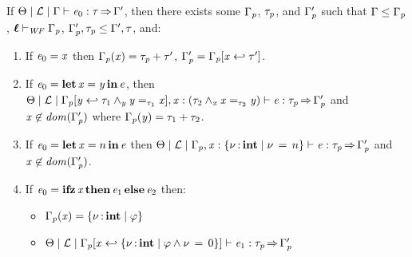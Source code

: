 \begin{lemma}[Inversion] %
  \label{lem:inversion}
  If 
  $ \Theta   \mid   \mathcal{L}   \mid   \Gamma   \vdash   \mathit{e_{{\mathrm{0}}}}  :  \tau   \operatorname{\Rightarrow}   \Gamma' $,
  then there exists some $\Gamma_{\mathit{p}}$, $\tau_{\mathit{p}}$, and $\Gamma'_{\mathit{p}}$
  such that $\Gamma  \leq  \Gamma_{\mathit{p}}$, $ \oldvec{\ell}   \vdash _{\wf}  \Gamma_{\ottmv{p}} $, $\Gamma'_{\mathit{p}}  ,  \tau_{\mathit{p}}  \leq  \Gamma'  ,  \tau$, and:
  \begin{enumerate}
  \item If $\mathit{e_{{\mathrm{0}}}}  =  \mathit{x}$ then $\Gamma_{\mathit{p}}  (  \mathit{x}  )  =  \tau_{\mathit{p}}  +  \tau'$,  $\Gamma'_{\mathit{p}}  =  \Gamma_{\mathit{p}}  [  \mathit{x}  \hookleftarrow  \tau'  ]$.
  \item If $\mathit{e_{{\mathrm{0}}}}  =   \operatorname{\mathbf{let}}  \mathit{x}  =  \mathit{y}  \operatorname{\mathbf{in}}  \mathit{e} $, then
    $ \Theta   \mid   \mathcal{L}   \mid   \Gamma_{\mathit{p}}  [  \mathit{y}  \hookleftarrow   \tau_{{\mathrm{1}}}  \wedge_{ \mathit{y} }   \mathit{y}  =_{ \tau_{{\mathrm{1}}} }  \mathit{x}    ]  ,  \mathit{x}  :  (   \tau_{{\mathrm{2}}}  \wedge_{ \mathit{x} }   \mathit{x}  =_{ \tau_{{\mathrm{2}}} }  \mathit{y}    )   \vdash   \mathit{e}  :  \tau_{\mathit{p}}   \operatorname{\Rightarrow}   \Gamma'_{\mathit{p}} $
    and $ \mathit{x}  \not\in   \mathit{dom}( \Gamma'_{\mathit{p}} )  $ where $\Gamma_{\mathit{p}}  (  \mathit{y}  )  =  \tau_{{\mathrm{1}}}  +  \tau_{{\mathrm{2}}}$.
  \item If $\mathit{e_{{\mathrm{0}}}}  =   \operatorname{\mathbf{let}}  \mathit{x}  =  n  \operatorname{\mathbf{in}}  \mathit{e} $ then $ \Theta   \mid   \mathcal{L}   \mid   \Gamma_{\mathit{p}}  ,  \mathit{x}  :   \left\{{  \nu  \operatorname{:} \mathbf{int} \mid  \nu \, = \, n }\right\}    \vdash   \mathit{e}  :  \tau_{\mathit{p}}   \operatorname{\Rightarrow}   \Gamma'_{\mathit{p}} $ and $ \mathit{x}  \not\in   \mathit{dom}( \Gamma'_{\mathit{p}} )  $.
  \item If $\mathit{e_{{\mathrm{0}}}}  =   \operatorname{\mathbf{ifz}}  \mathit{x}  \operatorname{\mathbf{then}}  \mathit{e_{{\mathrm{1}}}}  \operatorname{\mathbf{else}}  \mathit{e_{{\mathrm{2}}}} $ then:
    \begin{itemize}
    \item $\Gamma_{\mathit{p}}  (  \mathit{x}  )  =   \left\{{  \nu  \operatorname{:} \mathbf{int} \mid  \varphi }\right\} $
    \item $ \Theta   \mid   \mathcal{L}   \mid   \Gamma_{\mathit{p}}  [  \mathit{x}  \hookleftarrow   \left\{{  \nu  \operatorname{:} \mathbf{int} \mid   \varphi  \wedge  \nu \, = \, 0  }\right\}   ]   \vdash   \mathit{e_{{\mathrm{1}}}}  :  \tau_{\mathit{p}}   \operatorname{\Rightarrow}   \Gamma'_{\mathit{p}} $

\end{itemize}
\end{enumerate}
\end{lemma}
